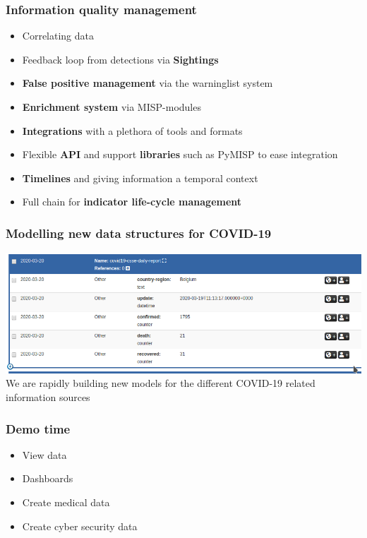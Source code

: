 \begin{frame}
\frametitle{Information quality management}
    \begin{itemize}
        \item Correlating data
        \item Feedback loop from detections via {\bf Sightings}
        \item {\bf False positive management} via the warninglist system
        \item {\bf Enrichment system} via MISP-modules
        \item {\bf Integrations} with a plethora of tools and formats
        \item Flexible {\bf API} and support {\bf libraries} such as PyMISP to ease integration
        \item {\bf Timelines} and giving information a temporal context
        \item Full chain for {\bf indicator life-cycle management}
    \end{itemize}
\end{frame}

\begin{frame}
    \frametitle{Modelling new data structures for COVID-19}
    \includegraphics[width=1.00\linewidth]{covidobject.png}
    We are rapidly building new models for the different COVID-19 related information sources
\end{frame}

\begin{frame}
    \frametitle{Demo time}
    \begin{itemize}
        \item View data
        \item Dashboards
        \item Create medical data
        \item Create cyber security data
    \end{itemize}
\end{frame}

